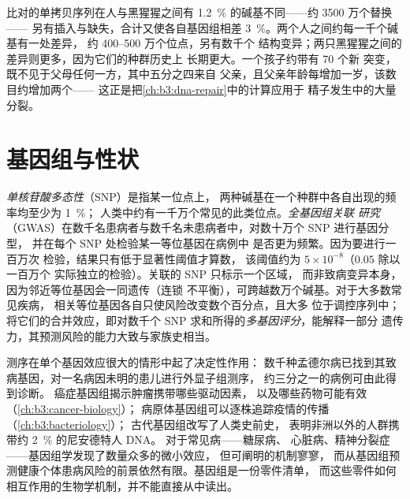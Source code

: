 \begin{example}[人与黑猩猩]\label{ex:b3:genomics:chimp}
比对的单拷贝序列在人与黑猩猩之间有
\qty{1.2}{\%} 的碱基不同——约 3500 万个替换——
另有插入与缺失，合计又使各自基因组相差
\qty{3}{\%}。两个人之间约每一千个碱基有一处差异，
约 \numrange{400}{500} 万个位点，另有数千个
结构变异；两只黑猩猩之间的差异则更多，因为它们的种群历史上
长期更大。一个孩子约带有 \num{70} 个新
突变，既不见于父母任何一方，其中五分之四来自
父亲，且父亲年龄每增加一岁，该数目约增加两个——
这正是把\cref{ch:b3:dna-repair}中的计算应用于
精子发生中的大量分裂。
\end{example}

\section{基因组与性状}

\begin{definition}[全基因组关联]\label{def:b3:genomics:gwas}
\emph{单核苷酸多态性}（SNP）是指某一位点上，
两种碱基在一个种群中各自出现的频率均至少为 \qty{1}{\%}；
人类中约有一千万个常见的此类位点。\emph{全基因组关联
研究}（GWAS）在数千名患病者与数千名未患病者中，对数十万个 SNP 进行基因分型，
并在每个 SNP 处检验某一等位基因在病例中
是否更为频繁。因为要进行一百万次
检验，结果只有低于显著性阈值才算数，
该阈值约为 $5\times 10^{-8}$（$0.05$ 除以一百万个
实际独立的检验）。关联的 SNP 只标示一个区域，
而非致病变异本身，因为邻近等位基因会一同遗传（连锁
不平衡），可跨越数万个碱基。对于大多数常见疾病，
相关等位基因各自只使风险改变数个百分点，且大多
位于调控序列中；将它们的合并效应，即对数千个
SNP 求和所得的\emph{多基因评分}，能解释一部分
遗传力，其预测风险的能力大致与家族史相当。
\end{definition}

\begin{remark}[基因组学已取得和尚未取得的成果]\label{rem:b3:genomics:delivered}
测序在单个基因效应很大的情形中起了决定性作用：
数千种孟德尔病已找到其致病基因，对一名病因未明的患儿进行外显子组测序，
约三分之一的病例可由此得到诊断。
癌症基因组揭示肿瘤携带哪些驱动因素，
以及哪些药物可能有效（\cref{ch:b3:cancer-biology}）；
病原体基因组可以逐株追踪疫情的传播（\cref{ch:b3:bacteriology}）；
古代基因组改写了人类史前史，
表明非洲以外的人群携带约 \qty{2}{\%} 的尼安德特人 DNA。
对于常见病——糖尿病、
心脏病、精神分裂症——基因组学发现了数量众多的微小效应，
但可阐明的机制寥寥，
而从基因组预测健康个体患病风险的前景依然有限。基因组是一份零件清单，
而这些零件如何相互作用的生物学机制，并不能直接从中读出。
\end{remark}

